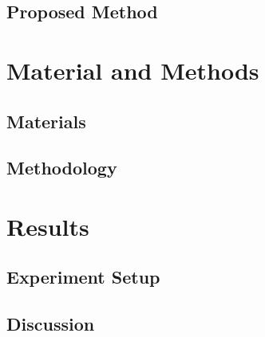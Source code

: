 \documentclass{article}
\begin{document}
	\subsection{Proposed Method}
	\section{Material and Methods}
	\subsection{Materials}
	\subsection{Methodology}
	\section{Results}
	\subsection{Experiment Setup}
	\subsection{Discussion}
	
	 
	 
	
	\appendix
\end{document}

